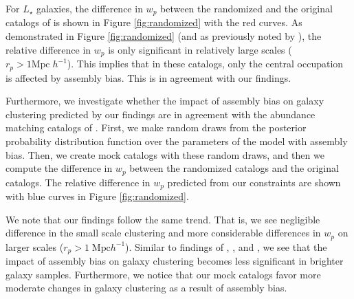 \documentclass[twocolumn]{aastex61}
\begin{document}
For $L_{\star}$ galaxies, the difference in $w_{p}$ between the randomized and the original catalogs of \citet{hw2013} is shown in Figure \ref{fig:randomized} with the red curves. As demonstrated in Figure \ref{fig:randomized} (and as previously noted by \citealt{arz2014,edHOD-weinberg}), the relative difference in $w_{p}$ is only significant in relatively large scales ($r_{p} > 1 \mathrm{Mpc} \; h^{-1}$). This implies that in these catalogs, only the central occupation is affected by assembly bias. This is in agreement with our findings. 

Furthermore, we investigate whether the impact of assembly bias on galaxy clustering predicted by our findings are in agreement with the abundance matching catalogs of \citet{hw2013}. First, we make random draws from the posterior probability distribution function over the parameters of the model with assembly bias. Then, we create mock catalogs with these random draws, and then we compute the difference in $w_{p}$ between the randomized catalogs and the original catalogs. The relative difference in $w_{p}$ predicted from our constraints are shown with blue curves in Figure \ref{fig:randomized}. 

We note that our findings follow the same trend. That is, we see negligible difference in the small scale clustering and more considerable differences in $w_{p}$ on larger scales ($r_{p} > 1\; \mathrm{Mpc}h^{-1}$). Similar to findings of \citet{arz2014}, \citet{lehman2015}, and \citet{edHOD-weinberg}, we see that the impact of assembly bias on galaxy clustering becomes less significant in brighter galaxy samples. Furthermore, we notice that our mock catalogs favor more moderate changes in galaxy clustering as a result of assembly bias. 
\end{document}

